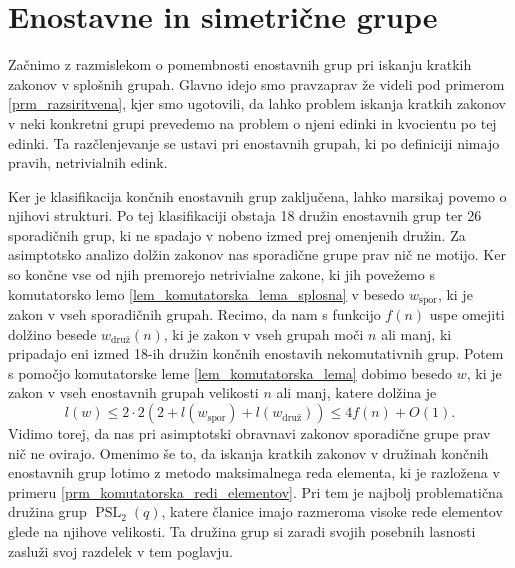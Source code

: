 \section{Enostavne in simetrične grupe}



Začnimo z razmislekom o pomembnosti enostavnih grup pri iskanju kratkih zakonov v splošnih grupah. Glavno idejo smo pravzaprav že videli pod primerom \ref{prm_razsiritvena}, kjer smo ugotovili, da
lahko problem iskanja kratkih zakonov v neki konkretni grupi prevedemo na problem o njeni edinki in kvocientu po tej edinki. Ta razčlenjevanje se ustavi pri enostavnih grupah, ki po definiciji nimajo pravih, netrivialnih edink.

Ker je klasifikacija končnih enostavnih grup zaključena, lahko marsikaj povemo o njihovi strukturi. Po tej klasifikaciji obstaja 18 družin enostavnih grup ter 26 sporadičnih grup, ki ne spadajo v nobeno izmed prej omenjenih družin.
Za asimptotsko analizo dolžin zakonov nas sporadične grupe prav nič ne motijo. Ker so končne vse od njih premorejo netrivialne zakone, ki jih povežemo s komutatorsko lemo \ref{lem_komutatorska_lema_splosna} v besedo $w_{\text{spor}}$,
ki je zakon v vseh sporadičnih grupah. Recimo, da nam s funkcijo $f(n)$ uspe omejiti dolžino besede $w_{\text{druž}}(n)$, ki je zakon v vseh grupah moči $n$ ali manj, ki pripadajo eni izmed 18-ih družin končnih enostavih nekomutativnih grup.
Potem s pomočjo komutatorske leme \ref{lem_komutatorska_lema} dobimo besedo $w$, ki je zakon v vseh enostavnih grupah velikosti $n$ ali manj, katere dolžina je 
\begin{equation*}
    l(w) \le 2 \cdot 2 (2 + l(w_{\text{spor}}) + l(w_{\text{druž}}) )  \le 4f(n) + O(1).
\end{equation*}
Vidimo torej, da nas pri asimptotski obravnavi zakonov sporadične grupe prav nič ne ovirajo. Omenimo še to, da iskanja kratkih zakonov v družinah končnih enostavnih grup
lotimo z metodo maksimalnega reda elementa, ki je razložena v primeru \ref{prm_komutatorska_redi_elementov}. Pri tem je najbolj problematična družina grup $\operatorname{PSL}_2(q)$,
katere članice imajo razmeroma visoke rede elementov glede na njihove velikosti. Ta družina grup si zaradi svojih posebnih lasnosti zasluži svoj razdelek v tem poglavju.


